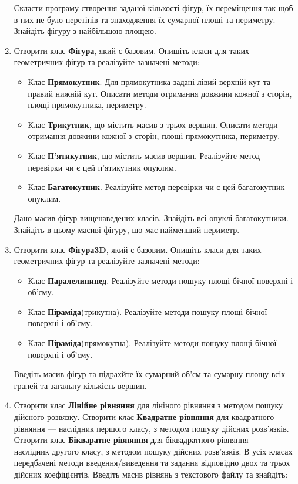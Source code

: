 \documentclass[]{article}
\begin{document}
\begin{enumerate}
  Скласти програму створення заданої кількості фігур, їх переміщення так
  щоб в них не було перетінів та знаходження їх сумарної площі та
  периметру. Знайдіть фігуру з найбільшою площею.

\item
  Створити клас \textbf{Фігура}, який є базовим. Опишіть класи для таких
  геометричних фігур та реалізуйте зазначені методи:

  \begin{itemize}
  \item
    Клас \textbf{Прямокутник}. Для прямокутника задані лівий верхній кут
    та правий нижній кут. Описати методи отримання довжини кожної з
    сторін, площі прямокутника, периметру.
  \item
    Клас \textbf{Трикутник}, що містить масив з трьох вершин. Описати
    методи отримання довжини кожної з сторін, площі прямокутника,
    периметру.
  \item
    Клас \textbf{П'ятикутник}, що містить масив вершин. Реалізуйте метод
    перевірки чи є цей п'ятикутник опуклим.
  \item
    Клас \textbf{Багатокутник}. Реалізуйте метод перевірки чи є цей
    багатокутник опуклим.
  \end{itemize}

  Дано масив фігур вищенаведених класів. Знайдіть всі опуклі
  багатокутники. Знайдіть в цьому масиві фігуру, що має найменший
  периметр.

\item
  Створити клас \textbf{Фігура3D}, який є базовим. Опишіть класи для
  таких геометричних фігур та реалізуйте зазначені методи:

  \begin{itemize}
  \item
    Клас \textbf{Паралелипипед}. Реалізуйте методи пошуку площі бічної
    поверхні і об'єму.
  \item
    Клас \textbf{Піраміда}(трикутна). Реалізуйте методи пошуку площі
    бічної поверхні і об'єму.
  \item
    Клас \textbf{Піраміда}(прямокутна). Реалізуйте методи пошуку площі
    бічної поверхні і об'єму.
  \end{itemize}

  Введіть масив фігур та підрахйте їх сумарний об'єм та сумарну площу
  всіх граней та загальну кількість вершин.

\item
  Створити клас \textbf{Лінійне рівняння} для лініного рівняння з
  методом пошуку дійсного розвязку. Створити клас \textbf{Квадратне
  рівняння} для квадратного рівняння --- наслідник першого класу, з
  методом пошуку дійсних розв'язків. Створити клас \textbf{Бікваратне
  рівняння} для біквадратного рівняння --- наслідник другого класу, з
  методом пошуку дійсних розв'язків. В усіх класах передбачені методи
  введення/виведення та задання відповідно двох та трьох дійсних
  коефіцієнтів. Введіть масив рівнянь з текстового файлу та знайдіть:


\end{enumerate}
\end{document}
